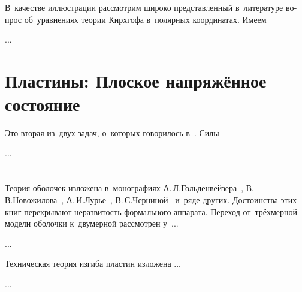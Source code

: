 \begin{otherlanguage}{russian}
В~качестве иллюстрации рассмотрим широко представленный в~литературе вопрос об~уравнениях теории Кирхгофа в~полярных координатах. Имеем

...



\section{Пластины: Плоское напряжённое состояние}

Это вторая из~двух задач, о~которых говорилось в~. Силы

...




\end{otherlanguage}

\vspace{8mm}
\hfill\begin{minipage}[b]{0.95\linewidth}
\fontsize{10}{12}\selectfont

\section*{\wordforbibliography}

\begin{otherlanguage}{russian}

Теория оболочек изложена в~монографиях А.\,Л.\;Гольденвейзера~\cite{goldenveizer-thinshells}, В.\,В.\;Новожилова~\cite{novozhilov-theoryofthinshells}, А.\,И.\;Лурье~\cite{lurie-thinwalledshells}, В.\,С.\;Черниной~\cite{chernina-thinwalledshells} и~ряде других. Достоинства этих книг перекрывают неразвитость формального аппарата. Переход от~трёхмерной модели оболочки к~двумерной рассмотрен у~...

...

Техническая теория изгиба пластин изложена ...

...

\end{otherlanguage}

\end{minipage}
